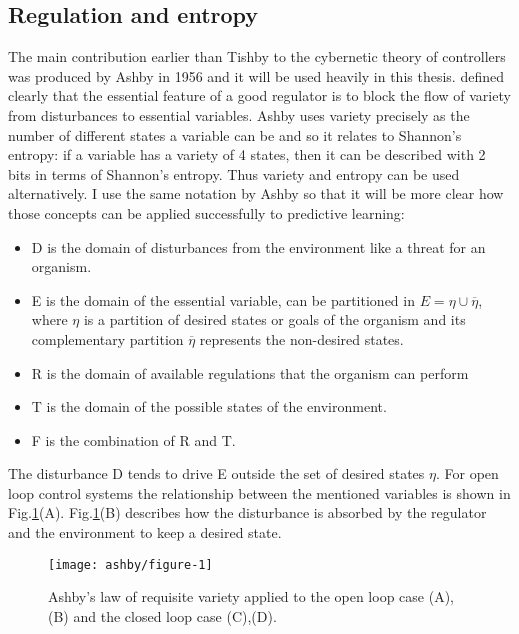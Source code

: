 \subsection{Regulation and entropy \label{Appendix:Ashby}}
The main contribution earlier than Tishby to the cybernetic theory of controllers
was produced by Ashby in 1956 and it will be used heavily in this thesis.
\citet{Ashby1956:IntroCybernetics} defined clearly that the
 essential feature of a good regulator is to block the flow of variety from
disturbances to essential variables. Ashby uses variety precisely as the number
 of different states a variable can be and so it relates to Shannon's entropy:
if a variable has a variety of 4 states, then it can be described with 2 bits in terms of Shannon's entropy.
Thus variety and entropy can be used alternatively.
I use the same notation by Ashby so that it will be more clear how those concepts
can be applied successfully to predictive learning:
\begin{itemize}
 \item D is the domain of disturbances from the environment like a threat for an organism.
 \item E is the domain of the essential variable, can be partitioned in
$E= \eta \cup \overline{\eta}$, where $\eta$ is a partition of desired states
 or goals of the organism and its complementary partition $\overline{\eta}$
 represents the non-desired states.
 \item R is the domain of available regulations that the organism can perform
 \item T is the domain of the possible states of the environment.
 \item F is the combination of R and T.
\end{itemize}
The disturbance D tends to drive E outside the set of desired states $\eta$.
For open loop control systems the relationship between the mentioned variables 
is shown in Fig.\ref{fig:infotheory:ashby-model}(A).
Fig.\ref{fig:infotheory:ashby-model}(B) describes how the disturbance is absorbed by the regulator
 and the environment to keep a desired state.
\begin{figure}[!htbp]
\begin{center}
 \texttt{[image: ashby/figure-1]}
\caption[Ashby requisite variety]{Ashby's law of requisite variety \citep{Ashby1956:IntroCybernetics} applied 
to the open loop case (A),(B) and the closed loop case (C),(D).
\label{fig:infotheory:ashby-model}
}
\end{center}
\end{figure}

